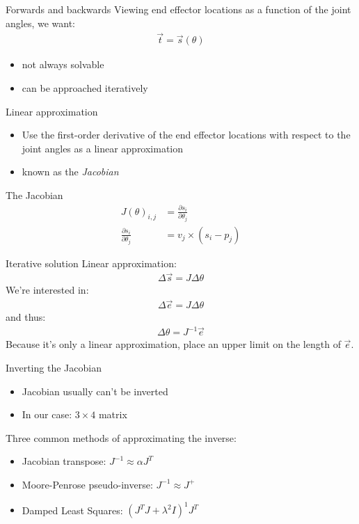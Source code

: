 \documentclass{beamer}
\begin{document}
\begin{frame}{Forwards and backwards}
  Viewing end effector locations as a function of the joint angles, we want:
  \begin{align*}
    \vec{t} = \vec{s}(\theta)
  \end{align*}

  \begin{itemize}
    \item not always solvable
    \item can be approached iteratively
  \end{itemize}
\end{frame}

\begin{frame}{Linear approximation}
  \begin{itemize}
  \item Use the first-order derivative of the end effector locations with
    respect to the joint angles as a linear approximation
  \item known as the \emph{Jacobian}
  \end{itemize}
  \begin{block}{The Jacobian}
    \begin{align*}
      J(\theta)_{i, j} &= \frac{\partial s_i}{\partial \theta_j} \\
      \frac{\partial s_i}{\partial \theta_j} &= v_j \times (s_i - p_j)
    \end{align*}
  \end{block}
\end{frame}

\begin{frame}{Iterative solution}
  Linear approximation:
  \begin{align*}
    \Delta \vec{s} = J \Delta\theta
  \end{align*}
  We're interested in:
  \begin{align*}
    \Delta \vec{e} = J \Delta\theta
  \end{align*}
  and thus:
  \begin{align*}
    \Delta \theta = J^{-1} \vec{e}
  \end{align*}
  \pause
  Because it's only a linear approximation, place an upper limit on the length
  of $\vec{e}$.
\end{frame}

\begin{frame}{Inverting the Jacobian}
  \begin{itemize}
    \item Jacobian usually can't be inverted
    \item In our case: $3\times4$ matrix
  \end{itemize}
  \pause
  Three common methods of approximating the inverse:
  \begin{itemize}
    \item Jacobian transpose: $J^{-1} \approx \alpha J^T$
    \item Moore-Penrose pseudo-inverse: $J^{-1} \approx J^{+}$
    \item Damped Least Squares: $(J^T J  + \lambda^2 I)^1 J^T$
  \end{itemize}
\end{frame}
\end{document}
